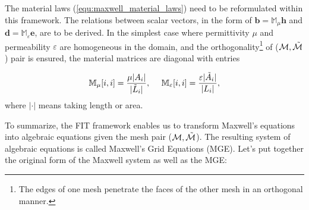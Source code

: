 \documentclass{report}
\begin{document}
The material laws (\ref{equ:maxwell_material_laws}) need to be reformulated within this framework. The relations between scalar vectors, in the form of $\mathbf{b} = \mathbb{M}_\mu \mathbf{h}$ and $\mathbf{d} = \mathbb{M}_\varepsilon \mathbf{e}$, are to be derived. In the simplest case where permittivity $\mu$ and permeability $\varepsilon$ are homogeneous in the domain, and the orthogonality\footnote{The edges of one mesh penetrate the faces of the other mesh in an orthogonal manner.} of ($\mathcal{M}, \Tilde{\mathcal{M}}$) pair is ensured, the material matrices are diagonal with entries 

\begin{equation*}
    \mathbb{M}_\mu[i,i] = \frac{\mu|A_i|}{|\Tilde{L}_i|}, \ \ \ \ \mathbb{M}_\varepsilon[i,i] = \frac{\varepsilon |\Tilde{A}_i|}{|L_i|},
\end{equation*}
where $|\cdot|$ means taking length or area.

To summarize, the FIT framework enables us to transform Maxwell’s equations into algebraic equations given the mesh pair ($\mathcal{M}, \Tilde{\mathcal{M}}$). The resulting system of algebraic equations is called Maxwell's Grid Equations (MGE). Let's put together the original form of the Maxwell system as well as the MGE:
\end{document}
